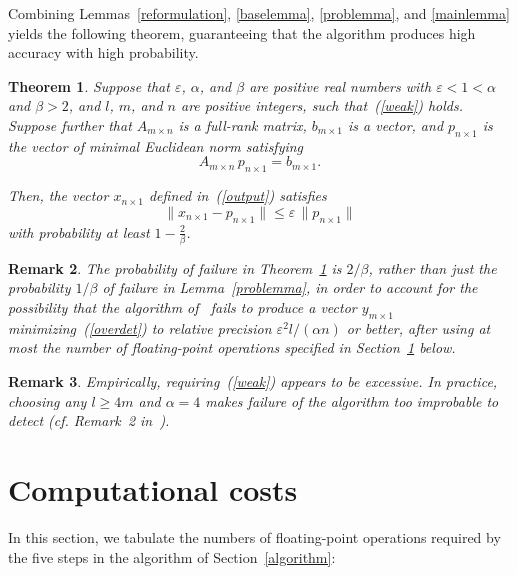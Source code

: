 \documentclass[letterpaper,12pt]{article}
\def\epsilon{\varepsilon}
\newtheorem{theorem}{Theorem}[section]
\newtheorem{remark1}[theorem]{Remark}
\newenvironment{remark}{\begin{remark1} \rm}{\end{remark1}}
\begin{document}
Combining Lemmas~\ref{reformulation}, \ref{baselemma}, \ref{problemma},
and \ref{mainlemma} yields the following theorem,
guaranteeing that the algorithm produces high accuracy with high probability.

\begin{theorem}
\label{main_theorem}
Suppose that $\epsilon$, $\alpha$, and $\beta$ are positive real numbers
with $\epsilon < 1 < \alpha$ and $\beta > 2$,
and $l$, $m$, and $n$ are positive integers, such that~(\ref{weak}) holds.
Suppose further that $A_{m \times n}$ is a full-rank matrix,
$b_{m \times 1}$ is a vector,
and $p_{n \times 1}$ is the vector of minimal Euclidean norm satisfying
\begin{equation}
A_{m \times n} \, p_{n \times 1} = b_{m \times 1}.
\end{equation}

Then, the vector $x_{n \times 1}$ defined in~(\ref{output}) satisfies
\begin{equation}
\| x_{n \times 1} - p_{n \times 1} \| \le \epsilon \, \| p_{n \times 1} \|
\end{equation}
with probability at least $1-\frac{2}{\beta}$.
\end{theorem}


\begin{remark}
The probability of failure in Theorem~\ref{main_theorem} is $2/\beta$,
rather than just the probability $1/\beta$ of failure
in Lemma~\ref{problemma}, in order to account for the possibility that
the algorithm of~\cite{rokhlin-tygert} fails to produce a vector
$y_{m \times 1}$ minimizing~(\ref{overdet}) to relative precision
$\epsilon^2 l/(\alpha n)$ or better,
after using at most the number of floating-point operations
specified in Section~\ref{costs} below.
\end{remark}


\begin{remark}
Empirically, requiring~(\ref{weak}) appears to be excessive.
In practice, choosing any $l \ge 4m$ and $\alpha = 4$ makes failure
of the algorithm too improbable to detect
({\it cf.} Remark~2 in~\cite{rokhlin-tygert}).
\end{remark}



\section{Computational costs}
\label{costs}

In this section, we tabulate the numbers of floating-point operations
required by the five steps in the algorithm of Section~\ref{algorithm}:
\end{document}
